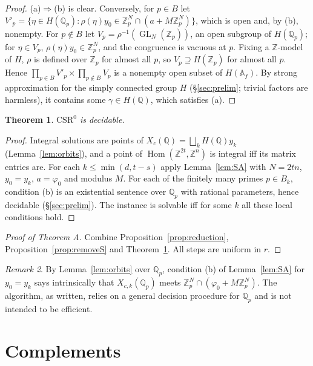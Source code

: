 \documentclass[11pt]{amsart}
\newtheorem{theorem}{Theorem}[section]
\theoremstyle{definition}
\theoremstyle{remark}
\newtheorem{remark}[theorem]{Remark}
\newcommand{\Z}{\mathbb{Z}}
\newcommand{\Q}{\mathbb{Q}}
\newcommand{\A}{\mathbb{A}}
\newcommand{\Zp}{\mathbb{Z}_p}
\newcommand{\Qp}{\mathbb{Q}_p}
\newcommand{\Hom}{\operatorname{Hom}}
\newcommand{\GL}{\operatorname{GL}}
\begin{document}
\begin{proof}
(a)$\Rightarrow$(b) is clear. Conversely, for $p\in B$ let
$V'_p=\{\eta\in H(\Qp):\rho(\eta)y_0\in\Zp^N\cap(a+M\Zp^N)\}$, which is open and,
by (b), nonempty. For $p\notin B$ let $V_p=\rho^{-1}(\GL_N(\Zp))$, an open
subgroup of $H(\Qp)$; for $\eta\in V_p$, $\rho(\eta)y_0\in\Zp^N$, and the
congruence is vacuous at $p$. Fixing a $\Z$-model of $H$, $\rho$ is defined over
$\Zp$ for almost all $p$, so $V_p\supseteq H(\Zp)$ for almost all $p$. Hence
$\prod_{p\in B}V'_p\times\prod_{p\notin B}V_p$ is a nonempty open subset of
$H(\A_f)$. By strong approximation for the simply connected group $H$
(\S\ref{sec:prelim}; trivial factors are harmless), it contains some
$\gamma\in H(\Q)$, which satisfies (a).
\end{proof}

\begin{theorem}\label{thm:csr0}
$\mathrm{CSR}^0$ is decidable.
\end{theorem}

\begin{proof}
Integral solutions are points of $X_c(\Q)=\bigsqcup_kH(\Q)y_k$
(Lemma~\ref{lem:orbits}), and a point of $\Hom(\Z^{2t},\Z^n)$ is integral iff its
matrix entries are. For each $k\le\min(d,t-s)$ apply Lemma~\ref{lem:SA} with
$N=2tn$, $y_0=y_k$, $a=\varphi_0$ and modulus $M$. For each of the finitely many
primes $p\in B_k$, condition (b) is an existential sentence over $\Qp$ with
rational parameters, hence decidable (\S\ref{sec:prelim}). The instance is solvable
iff for some $k$ all these local conditions hold.
\end{proof}

\begin{proof}[Proof of Theorem A]
Combine Proposition~\ref{prop:reduction}, Proposition~\ref{prop:removeS} and
Theorem~\ref{thm:csr0}. All steps are uniform in $r$.
\end{proof}

\begin{remark}
By Lemma~\ref{lem:orbits} over $\Qp$, condition (b) of Lemma~\ref{lem:SA} for
$y_0=y_k$ says intrinsically that $X_{c,k}(\Qp)$ meets $\Zp^N\cap(\varphi_0+M\Zp^N)$.
The algorithm, as written, relies on a general decision procedure for $\Qp$ and
is not intended to be efficient.
\end{remark}

\section{Complements}\label{sec:complements}
\end{document}

